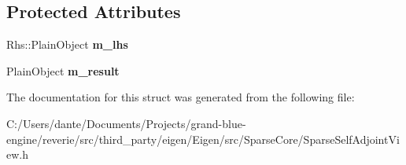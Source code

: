 \subsection*{Protected Attributes}
\begin{DoxyCompactItemize}
\item 
\mbox{\label{struct_eigen_1_1internal_1_1product__evaluator_3_01_product_3_01_lhs_view_00_01_rhs_00_01_defaul9695c5493cd4054bc6e3c91568225f16_a8f14c6eb811fc03d5105a7071f918b43}} 
Rhs\+::\+Plain\+Object {\bfseries m\+\_\+lhs}
\item 
\mbox{\label{struct_eigen_1_1internal_1_1product__evaluator_3_01_product_3_01_lhs_view_00_01_rhs_00_01_defaul9695c5493cd4054bc6e3c91568225f16_a4db616bbdbe03dd8cbd87c1cc634d740}} 
Plain\+Object {\bfseries m\+\_\+result}
\end{DoxyCompactItemize}


The documentation for this struct was generated from the following file\+:\begin{DoxyCompactItemize}
\item 
C\+:/\+Users/dante/\+Documents/\+Projects/grand-\/blue-\/engine/reverie/src/third\+\_\+party/eigen/\+Eigen/src/\+Sparse\+Core/Sparse\+Self\+Adjoint\+View.\+h\end{DoxyCompactItemize}
